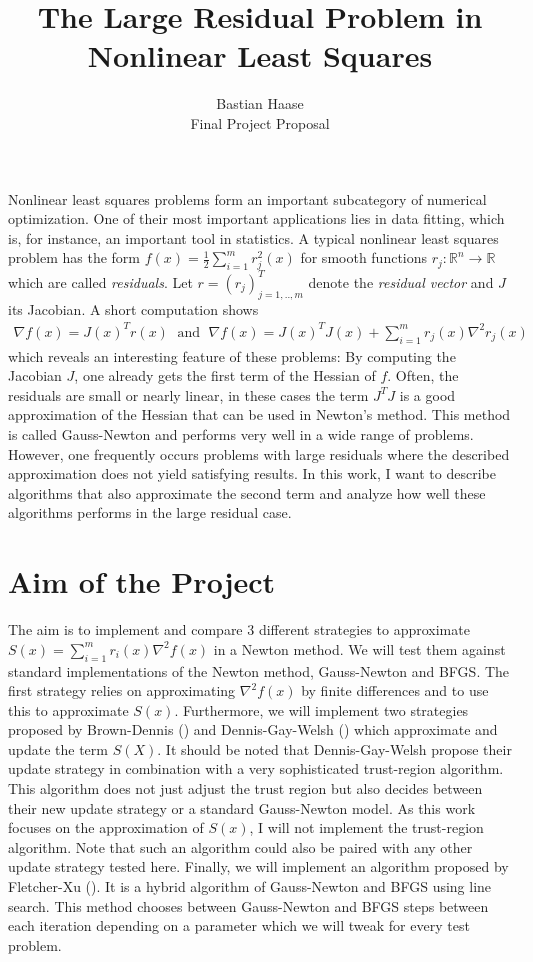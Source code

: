 \documentclass{article}
\title{The Large Residual Problem in Nonlinear Least Squares}
\author{Bastian Haase \\ Final Project Proposal}
\date{}
\begin{document}
\maketitle
Nonlinear least squares problems form an important subcategory of numerical
optimization. One of their most important applications lies in data fitting, which is, for instance, an important tool in statistics. A typical nonlinear least squares problem has the form 
$
  f(x)=\frac{1}{2}\sum_{i=1}^{m} r_j^2(x)
$
for smooth functions $r_j: \mathbb{R}^n\rightarrow \mathbb{R}$ which are called  \emph{residuals}. Let $r=(r_j)_{j=1,..,m}^T$ denote the \emph{residual vector} and $J$ its Jacobian. A short
computation shows 
\begin{align*}
  \nabla f(x)= J(x)^Tr(x)\; \textrm{ and } \; \nabla f(x)= J(x)^TJ(x)+ \sum_{i=1}^m r_j(x)\nabla^2 r_j(x)
\end{align*}
which reveals an interesting feature of these problems: By computing the Jacobian $J$, one already
gets the first term of the Hessian of $f$. Often, the residuals are small or nearly linear, in these cases the term $J^TJ$ is a good approximation of the Hessian that can be used in Newton's method. This method is called Gauss-Newton and performs very well in a wide range of problems. However, one frequently occurs problems with large residuals  where  the described approximation
does not yield satisfying results. In this work, I want to describe algorithms that also approximate the
second term and analyze how well these algorithms performs in the large residual case. 
\section{Aim of the Project}
The aim is to implement and compare 3 different strategies to approximate $S(x)=\sum_{i=1}^{m}r_i(x) \nabla^2f(x)$ in a Newton method. We will test them against standard implementations
of the Newton method, Gauss-Newton and BFGS. The first strategy relies on approximating $\nabla^2 f(x)$ by finite differences and to use this to approximate $S(x)$. Furthermore, we will implement two strategies proposed by Brown-Dennis (\cite{Brown1971}) and
Dennis-Gay-Welsh (\cite{Dennis1981}) which approximate and update the term $S(X)$. It should be noted
that Dennis-Gay-Welsh propose their update strategy in combination with a very sophisticated 
trust-region algorithm. This algorithm does not just adjust the trust region but also
decides between their new update strategy or a standard Gauss-Newton model. As this work
focuses on the approximation of $S(x)$, I will not implement the trust-region algorithm. 
Note that such an algorithm could also be paired with any other update strategy tested here. Finally,
we will implement an algorithm proposed by Fletcher-Xu (\cite{Fletcher1986}). It is a hybrid
algorithm of Gauss-Newton and BFGS using line search. This method chooses between Gauss-Newton and BFGS steps between
each iteration depending on a parameter which we will tweak for every test problem.
\end{document}
